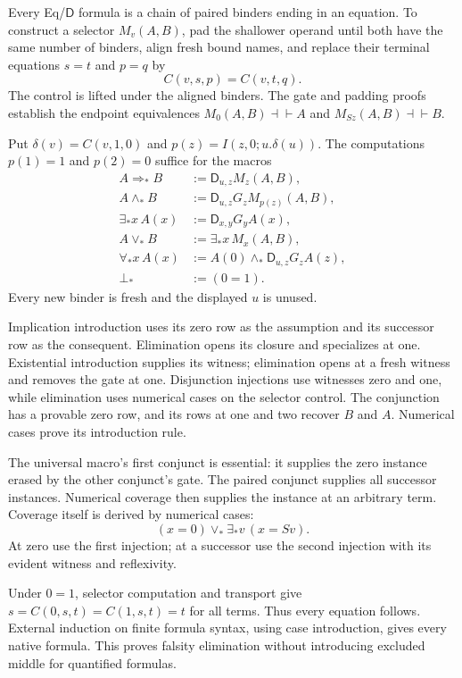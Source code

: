 \documentclass[11pt,letterpaper]{article}
\theoremstyle{definition}
\newcommand{\D}{\mathsf D}
\begin{document}
Every Eq/$\D$ formula is a chain of paired binders ending in an equation.
To construct a selector $M_v(A,B)$, pad the shallower operand until both
have the same number of binders, align fresh bound names, and replace their
terminal equations $s=t$ and $p=q$ by
\[
 C(v,s,p)=C(v,t,q).
\]
The control is lifted under the aligned binders. The gate and padding
proofs establish the endpoint equivalences
$M_0(A,B)\dashv\vdash A$ and $M_{Sz}(A,B)\dashv\vdash B$.

Put $\delta(v)=C(v,1,0)$ and $p(z)=I(z,0;u.\delta(u))$.
The computations $p(1)=1$ and $p(2)=0$ suffice for the macros
\begin{align*}
 A\Rightarrow_* B&:=\D_{u,z}M_z(A,B),\\
 A\wedge_* B&:=\D_{u,z}G_zM_{p(z)}(A,B),\\
 \exists_*x\,A(x)&:=\D_{x,y}G_yA(x),\\
 A\vee_* B&:=\exists_*x\,M_x(A,B),\\
 \forall_*x\,A(x)&:=A(0)\wedge_*\D_{u,z}G_zA(z),\\
 \bot_*&:=(0=1).
\end{align*}
Every new binder is fresh and the displayed $u$ is unused.

Implication introduction uses its zero row as the assumption and its
successor row as the consequent. Elimination opens its closure and
specializes at one. Existential introduction supplies its witness;
elimination opens at a fresh witness and removes the gate at one.
Disjunction injections use witnesses zero and one, while elimination
uses numerical cases on the selector control. The conjunction has a
provable zero row, and its rows at one and two recover $B$ and $A$.
Numerical cases prove its introduction rule.

The universal macro's first conjunct is essential: it supplies the zero
instance erased by the other conjunct's gate. The paired conjunct supplies
all successor instances. Numerical coverage then supplies the instance at
an arbitrary term. Coverage itself is derived by numerical cases:
\[
 (x=0)\vee_*\exists_*v\,(x=Sv).
\]
At zero use the first injection; at a successor use the second injection
with its evident witness and reflexivity.

Under $0=1$, selector computation and transport give
$s=C(0,s,t)=C(1,s,t)=t$ for all terms. Thus every equation follows.
External induction on finite formula syntax, using case introduction,
gives every native formula. This proves falsity elimination without
introducing excluded middle for quantified formulas.
\end{document}
